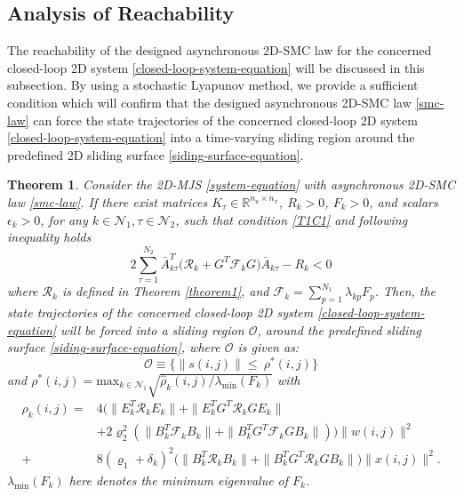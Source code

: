 \documentclass[journal,final,twocolumn]{IEEEtran}
\newtheorem{theorem}{Theorem}
\begin{document}
\subsection{Analysis of Reachability}\label{minimization} 
	 The reachability of the  designed asynchronous 2D-SMC law for the concerned closed-loop 2D system \eqref{closed-loop-system-equation} will be discussed in this subsection. By using a stochastic Lyapunov method, we provide a sufficient condition which will confirm that the designed asynchronous 2D-SMC law \eqref{smc-law} can force the state trajectories of the concerned closed-loop 2D system \eqref{closed-loop-system-equation} into a time-varying sliding region around the predefined 2D sliding surface \eqref{siding-surface-equation}.
	 

\begin{theorem}\label{theorem2}	
	Consider the 2D-MJS \eqref{system-equation} with asynchronous 2D-SMC law \eqref{smc-law}. If there exist matrices $K_{\tau }\in\mathbb{R}^{n_u\times n_x}$, $R_{k}>0$, $F_{k}>0$, and  scalars $\epsilon_{k}>0$, for any $k\in\mathcal{N}_{1}, \tau\in\mathcal{N}_{2}$, such that  condition \eqref{T1C1} and  following inequality holds
	\begin{equation} \label{T2C1}
		2\sum_{\tau =1}^{N_{2}} \bar{A}^{T}_{k\tau }\big(\mathcal{R}_{k}+G^{T}\mathcal{F}_{k}G\big)\bar{A}_{k\tau }-R_{k} <0
	\end{equation}
	where $\mathcal{R}_{k}$ is defined in Theorem \ref{theorem1}, and $\mathcal{F}_{k}=\sum_{p=1}^{N_{1}}\lambda_{kp}F_{p}$. Then, the state trajectories of the concerned closed-loop 2D system \eqref{closed-loop-system-equation} will be forced into a sliding region $\mathcal{O}$, around the predefined sliding surface \eqref{siding-surface-equation}, where  $\mathcal{O}$ is given as:
	\begin{equation}\label{smc-region}
		\mathcal{O}\equiv\Big\{\|s(i,j)\|\leq\ \rho^{*}(i,j) \Big\}
	\end{equation} 
	and $\rho^{*}(i,j) = \mathrm{max}_{k\in\mathcal{N}_{1}}\sqrt{\hat{\rho}_{k}(i,j)/
	\lambda_{\mathrm{min}}(F_{k})}$ with
	\begin{equation*}
		 \begin{split}
		 	\hat{\rho}_{k}(i,j)=&4\big(\|E^{T}_{k}\mathcal{R}_{k}E_{k}\|+ \|E^{T}_{k}G^{T}\mathcal{R}_{k}GE_{k}\|\\
		 	&+2\varrho_{2}^{2}(\|B^{T}_{k}\mathcal{F}_{k}B_{k}\|+ \|B^{T}_{k}G^{T}\mathcal{F}_{k}GB_{k}\| )\big)\|w(i,j)\|^{2}\\
		 	+&8(\varrho_{1}+\delta_{k})^{2}\big(\|B^{T}_{k}\mathcal{R}_{k}B_{k}\|+\|B^{T}_{k}G^{T}\mathcal{R}_{k}GB_{k}\|\big)\|x(i,j)\|^{2}.
		 \end{split}
	\end{equation*}
	$\lambda_{\mathrm{min}}(F_{k})$ here denotes the minimum eigenvalue of $F_{k}$.
\end{theorem} 
\end{document}
